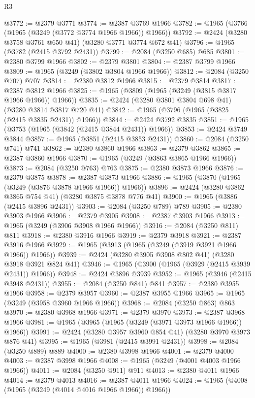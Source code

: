 \begin{lexlean}{R3}
\begin{coremodule}
@3772 := @2379 @3771
@3774 := @2387 @3769 @1966
@3782 := @1965 (@3766 (@1965 (@3249 (@3772 @3774 @1966 @1966)) @1966))
@3792 := @2424 (@3280 @3758 @3761 @650 @41) (@3280 @3771 @3774 @672 @41)
@3796 := @1965 (@3782 (@2415 @3792 @2431))
@3799 := @2084 (@3250 @685) @685
@3801 := @2380 @3799 @1966
@3802 := @2379 @3801
@3804 := @2387 @3799 @1966
@3809 := @1965 (@3249 (@3802 @3804 @1966 @1966))
@3812 := @2084 (@3250 @707) @707
@3814 := @2380 @3812 @1966
@3815 := @2379 @3814
@3817 := @2387 @3812 @1966
@3825 := @1965 (@3809 (@1965 (@3249 (@3815 @3817 @1966 @1966)) @1966))
@3835 := @2424 (@3280 @3801 @3804 @698 @41) (@3280 @3814 @3817 @720 @41)
@3842 := @1965 (@3796 (@1965 (@3825 (@2415 @3835 @2431)) @1966))
@3844 := @2424 @3792 @3835
@3851 := @1965 (@3753 (@1965 (@3842 (@2415 @3844 @2431)) @1966))
@3853 := @2424 @3749 @3844
@3857 := @1965 (@3851 (@2415 @3853 @2431))
@3860 := @2084 (@3250 @741) @741
@3862 := @2380 @3860 @1966
@3863 := @2379 @3862
@3865 := @2387 @3860 @1966
@3870 := @1965 (@3249 (@3863 @3865 @1966 @1966))
@3873 := @2084 (@3250 @763) @763
@3875 := @2380 @3873 @1966
@3876 := @2379 @3875
@3878 := @2387 @3873 @1966
@3886 := @1965 (@3870 (@1965 (@3249 (@3876 @3878 @1966 @1966)) @1966))
@3896 := @2424 (@3280 @3862 @3865 @754 @41) (@3280 @3875 @3878 @776 @41)
@3900 := @1965 (@3886 (@2415 @3896 @2431))
@3903 := @2084 (@3250 @789) @789
@3905 := @2380 @3903 @1966
@3906 := @2379 @3905
@3908 := @2387 @3903 @1966
@3913 := @1965 (@3249 (@3906 @3908 @1966 @1966))
@3916 := @2084 (@3250 @811) @811
@3918 := @2380 @3916 @1966
@3919 := @2379 @3918
@3921 := @2387 @3916 @1966
@3929 := @1965 (@3913 (@1965 (@3249 (@3919 @3921 @1966 @1966)) @1966))
@3939 := @2424 (@3280 @3905 @3908 @802 @41) (@3280 @3918 @3921 @824 @41)
@3946 := @1965 (@3900 (@1965 (@3929 (@2415 @3939 @2431)) @1966))
@3948 := @2424 @3896 @3939
@3952 := @1965 (@3946 (@2415 @3948 @2431))
@3955 := @2084 (@3250 @841) @841
@3957 := @2380 @3955 @1966
@3958 := @2379 @3957
@3960 := @2387 @3955 @1966
@3965 := @1965 (@3249 (@3958 @3960 @1966 @1966))
@3968 := @2084 (@3250 @863) @863
@3970 := @2380 @3968 @1966
@3971 := @2379 @3970
@3973 := @2387 @3968 @1966
@3981 := @1965 (@3965 (@1965 (@3249 (@3971 @3973 @1966 @1966)) @1966))
@3991 := @2424 (@3280 @3957 @3960 @854 @41) (@3280 @3970 @3973 @876 @41)
@3995 := @1965 (@3981 (@2415 @3991 @2431))
@3998 := @2084 (@3250 @889) @889
@4000 := @2380 @3998 @1966
@4001 := @2379 @4000
@4003 := @2387 @3998 @1966
@4008 := @1965 (@3249 (@4001 @4003 @1966 @1966))
@4011 := @2084 (@3250 @911) @911
@4013 := @2380 @4011 @1966
@4014 := @2379 @4013
@4016 := @2387 @4011 @1966
@4024 := @1965 (@4008 (@1965 (@3249 (@4014 @4016 @1966 @1966)) @1966))

\end{coremodule}
\end{lexlean}
